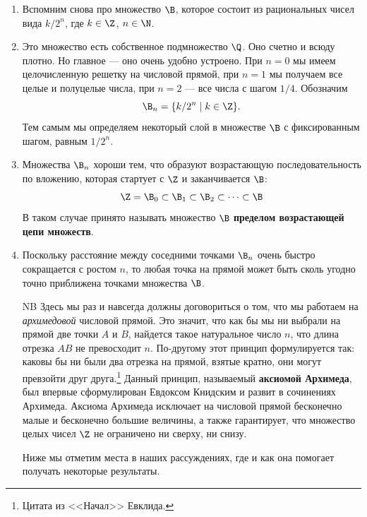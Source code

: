 

\begin{enumerate}
\item Вспомним снова про множество $\B$, которое состоит из рациональных чисел вида $k/2^n$, где $k\in\Z$, $n\in\N$.
\item Это множество есть собственное подмножество $\Q$. Оно счетно и всюду плотно. Но главное --- оно очень удобно устроено.
При $n=0$ мы имеем целочисленную решетку на числовой прямой, при $n=1$ мы получаем все целые и полуцелые числа, при $n=2$ --- все числа с шагом $1/4$. Обозначим
$$
\B_n=\{k/2^n\mid k\in\Z\}.
$$
Тем самым мы определяем некоторый слой в множестве $\B$ с фиксированным шагом, равным $1/2^n$.
\item Множества $\B_n$ хороши тем, что образуют возрастающую последовательность по вложению, которая стартует с $\Z$ и заканчивается $\B$:
$$
\Z=\B_0\subset\B_1\subset\B_2\subset\dots\subset\B
$$
В таком случае принято называть множество $\B$ \textbf{пределом возрастающей цепи множеств}.
\item Поскольку расстояние между соседними точками $\B_n$ очень быстро сокращается с ростом $n$, то любая точка на прямой может быть сколь угодно точно приближена точками множества $\B$.

\item[\color{darkred}NB] Здесь мы раз и навсегда должны договориться о том, что мы работаем на \textit{архимедовой} числовой прямой. Это значит, что как бы мы ни выбрали на прямой две точки $A$ и $B$, найдется такое натуральное число $n$, что длина отрезка $AB$ не превосходит $n$. По-другому этот принцип формулируется так: каковы бы ни были два отрезка на прямой, взятые кратно, они могут превзойти друг друга.\footnote{Цитата из <<Начал>> Евклида.} Данный принцип, называемый \textbf{аксиомой Архимеда}, был впервые сформулирован Евдоксом Книдским и развит в сочинениях Архимеда. Аксиома Архимеда исключает на числовой прямой бесконечно малые и бесконечно большие величины, а также гарантирует, что множество целых чисел $\Z$ не ограничено ни сверху, ни снизу.

Ниже мы отметим места в наших рассуждениях, где и как она помогает получать некоторые результаты.


\end{enumerate}
